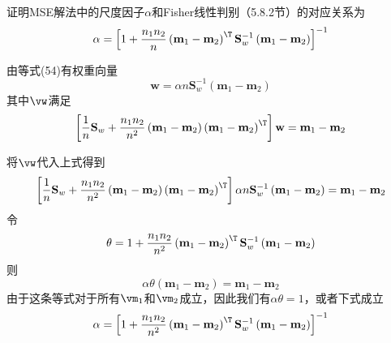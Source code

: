 \documentclass[reportComp]{thesis}
\begin{document}
\begin{question}[\textsection 5 Q21]
证明MSE解法中的尺度因子$\alpha$和Fisher线性判别（5.8.2节）的对应关系为
\[\alpha=\left[1+\frac{n_{1} n_{2}}{n}\left(\mathbf{m}_{1}-\mathbf{m}_{2}\right)^\T  \mathbf{S}_{w}^{-1}\left(\mathbf{m}_{1}-\mathbf{m}_{2}\right)\right]^{-1}\]
\end{question}
\begin{answer}
由等式(54)有权重向量
\[\mathbf{w}=\alpha n \mathbf{S}_{w}^{-1}\left(\mathbf{m}_{1}-\mathbf{m}_{2}\right)\]
其中$\vw$满足
\[\left[\frac{1}{n} \mathbf{S}_{w}+\frac{n_{1} n_{2}}{n^{2}}\left(\mathbf{m}_{1}-\mathbf{m}_{2}\right)\left(\mathbf{m}_{1}-\mathbf{m}_{2}\right)^\T \right] \mathbf{w}=\mathbf{m}_{1}-\mathbf{m}_{2}\]

将$\vw$代入上式得到
\[\left[\frac{1}{n} \mathbf{S}_{w}+\frac{n_{1} n_{2}}{n^{2}}\left(\mathbf{m}_{1}-\mathbf{m}_{2}\right)\left(\mathbf{m}_{1}-\mathbf{m}_{2}\right)^\T \right] \alpha n \mathbf{S}_{w}^{-1}\left(\mathbf{m}_{1}-\mathbf{m}_{2}\right)=\mathbf{m}_{1}-\mathbf{m}_{2}\]
令
\[\theta=1+\frac{n_{1} n_{2}}{n^{2}}\left(\mathbf{m}_{1}-\mathbf{m}_{2}\right)^\T  \mathbf{S}_{w}^{-1}\left(\mathbf{m}_{1}-\mathbf{m}_{2}\right)\]
则
\[\alpha \theta\left(\mathbf{m}_{1}-\mathbf{m}_{2}\right)=\mathbf{m}_{1}-\mathbf{m}_{2}\]
由于这条等式对于所有$\vm_1$和$\vm_2$成立，因此我们有$\alpha\theta=1$，或者下式成立
\[\alpha=\left[1+\frac{n_{1} n_{2}}{n^{2}}\left(\mathbf{m}_{1}-\mathbf{m}_{2}\right)^\T  \mathbf{S}_{w}^{-1}\left(\mathbf{m}_{1}-\mathbf{m}_{2}\right)\right]^{-1}\]
\end{answer}
\end{document}

